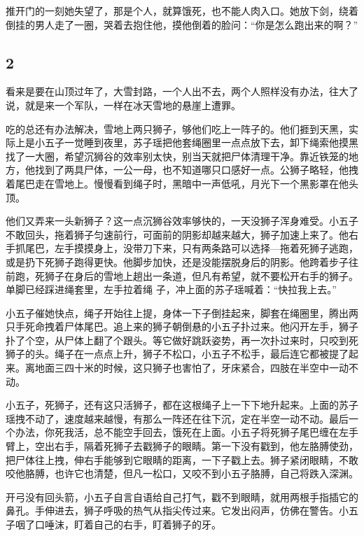推开门的一刻她失望了，那是个人，就算饿死，也不能人肉入口。她放下剑，绕着倒挂的男人走了一圈，哭着去抱住他，摸他倒着的脸问：“你是怎么跑出来的啊？”
\newline

{\centering\subsection{2}}

看来是要在山顶过年了，大雪封路，一个人出不去，两个人照样没有办法，往大了说，就是来一个军队，一样在冰天雪地的悬崖上遭罪。

吃的总还有办法解决，雪地上两只狮子，够他们吃上一阵子的。他们捱到天黑，实际上是小五子一觉睡到夜里，苏子瑶把他套绳圈里一点点放下去，卸下绳索他摸黑找了一大圈，希望沉狮谷的效率别太快，别当天就把尸体清理干净。靠近铁笼的地方，他找到了两具尸体，一公一母，也不知道哪只口感好一点。公狮子略轻，他拽着尾巴走在雪地上。慢慢看到绳子时，黑暗中一声低吼，月光下一个黑影罩在他头顶。

他们又弄来一头新狮子？这一点沉狮谷效率够快的，一天没狮子浑身难受。小五子不敢回头，拖着狮子匀速前行，可面前的阴影却越来越大，狮子加速上来了。他右手抓尾巴，左手摸摸身上，没带刀下来，只有两条路可以选择—拖着死狮子逃跑，或是扔下死狮子跑得更快。他脚步加快，还是没能摆脱身后的阴影。他跨着步子往前跑，死狮子在身后的雪地上趟出一条道，但凡有希望，就不要松开右手的狮子。单脚已经踩进绳套里，左手拉着绳
子，冲上面的苏子瑶喊着：“快拉我上去。”

小五子催她快点，绳子开始往上提，身体一下子倒挂起来，脚套在绳圈里，腾出两只手死命拽着尸体尾巴。追上来的狮子朝倒悬的小五子扑过来。他闪开左手，狮子扑了个空，从尸体上翻了个跟头。等它做好跳跃姿势，再一次扑过来时，只咬到死狮子的头。绳子在一点点上升，狮子不松口，小五子不松手，最后连它都被提了起来。离地面三四十米的时候，这只狮子也害怕了，牙床紧合，四肢在半空中一动不动。

小五子，死狮子，还有这只活狮子，都在这根绳子上一下下地升起来。上面的苏子瑶拽不动了，速度越来越慢，有那么一阵还在往下沉，定在半空一动不动。最后一个办法，你死我活，总不能空手回去，饿死在上面。小五子将死狮子尾巴缠在左手臂上，空出右手，隔着死狮子去戳狮子的眼睛。第一下没有戳到，他左胳膊使劲，把尸体往上拽，伸右手能够到它眼睛的距离，一下子戳上去。狮子紧闭眼睛，不敢咬他胳膊，也许它也清楚，但凡一松口，又咬不到小五子胳膊，自己将跌入深渊。

开弓没有回头箭，小五子自言自语给自己打气，戳不到眼睛，就用两根手指插它的鼻孔。手伸进去，狮子呼吸的热气从指尖传过来。它发出闷声，仿佛在警告。小五子咽了口唾沫，盯着自己的右手，盯着狮子的牙。

